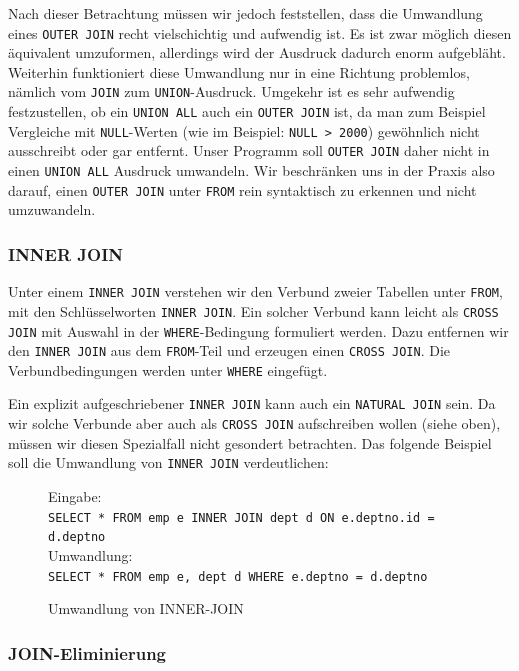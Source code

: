 Nach dieser Betrachtung müssen wir jedoch feststellen, dass die Umwandlung eines \verb|OUTER JOIN| recht vielschichtig und aufwendig ist. Es ist zwar möglich diesen äquivalent umzuformen, allerdings wird der Ausdruck dadurch enorm aufgebläht. Weiterhin funktioniert diese Umwandlung nur in eine Richtung problemlos, nämlich vom \verb|JOIN| zum \verb|UNION|-Ausdruck. Umgekehr ist es sehr aufwendig festzustellen, ob ein \verb|UNION ALL| auch ein \verb|OUTER JOIN| ist, da man zum Beispiel Vergleiche mit \verb|NULL|-Werten (wie im Beispiel: \verb|NULL > 2000|) gewöhnlich nicht ausschreibt oder gar entfernt. Unser Programm soll \verb|OUTER JOIN| daher nicht in einen \verb|UNION ALL| Ausdruck umwandeln. Wir beschränken uns in der Praxis also darauf, einen \verb|OUTER JOIN| unter \verb|FROM| rein syntaktisch zu erkennen und nicht umzuwandeln.

\subsubsection*{INNER JOIN}

Unter einem \verb|INNER JOIN| verstehen wir den Verbund zweier Tabellen unter \verb|FROM|, mit den Schlüsselworten \verb|INNER JOIN|. Ein solcher Verbund kann leicht als \verb|CROSS JOIN| mit Auswahl in der \verb|WHERE|-Bedingung formuliert werden. Dazu entfernen wir den \verb|INNER JOIN| aus dem \verb|FROM|-Teil und erzeugen einen \verb|CROSS JOIN|. Die Verbundbedingungen werden unter \verb|WHERE| eingefügt.

Ein explizit aufgeschriebener \verb|INNER JOIN| kann auch ein \verb|NATURAL JOIN| sein. Da wir solche Verbunde aber auch als \verb|CROSS JOIN| aufschreiben wollen (siehe oben), müssen wir diesen Spezialfall nicht gesondert betrachten. Das folgende Beispiel soll die Umwandlung von \verb|INNER JOIN| verdeutlichen:

\begin{figure}[h]
Eingabe:\\
\verb|SELECT * FROM emp e INNER JOIN dept d ON e.deptno.id = d.deptno|\\

Umwandlung:\\
\verb|SELECT * FROM emp e, dept d WHERE e.deptno = d.deptno|\\
\caption{Umwandlung von INNER-JOIN}
\end{figure}


\subsubsection{JOIN-Eliminierung}

